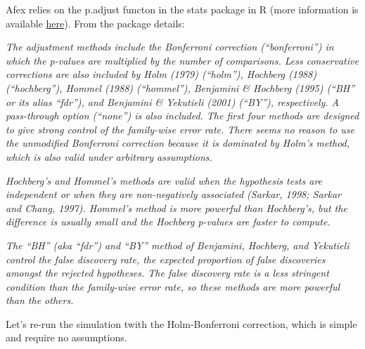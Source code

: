 \documentclass[]{book}
\begin{document}
Afex relies on the p.adjust functon in the stats package in R (more information is available \href{https://www.rdocumentation.org/packages/stats/versions/3.1.1/topics/p.adjust}{here}). From the package details:

\emph{The adjustment methods include the Bonferroni correction (``bonferroni'') in which the p-values are multiplied by the number of comparisons. Less conservative corrections are also included by Holm (1979) (``holm''), Hochberg (1988) (``hochberg''), Hommel (1988) (``hommel''), Benjamini \& Hochberg (1995) (``BH'' or its alias ``fdr''), and Benjamini \& Yekutieli (2001) (``BY''), respectively. A pass-through option (``none'') is also included. The first four methods are designed to give strong control of the family-wise error rate. There seems no reason to use the unmodified Bonferroni correction because it is dominated by Holm's method, which is also valid under arbitrary assumptions.}

\emph{Hochberg's and Hommel's methods are valid when the hypothesis tests are independent or when they are non-negatively associated (Sarkar, 1998; Sarkar and Chang, 1997). Hommel's method is more powerful than Hochberg's, but the difference is usually small and the Hochberg p-values are faster to compute.}

\emph{The ``BH'' (aka ``fdr'') and ``BY'' method of Benjamini, Hochberg, and Yekutieli control the false discovery rate, the expected proportion of false discoveries amongst the rejected hypotheses. The false discovery rate is a less stringent condition than the family-wise error rate, so these methods are more powerful than the others.}

Let's re-run the simulation twith the Holm-Bonferroni correction, which is simple and require no assumptions.
\end{document}
